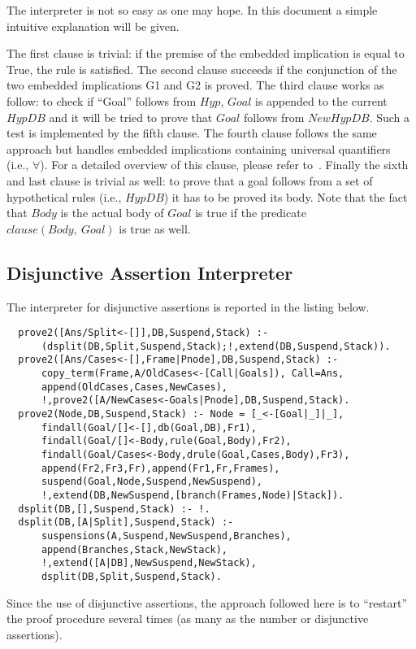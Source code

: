 The interpreter is not so easy as one may hope. In this document a simple
intuitive explanation will be given.

The first clause is trivial: if the premise of the embedded implication is equal to True,
the rule is satisfied. The second clause succeeds if the conjunction of the two embedded implications
G1 and G2 is proved. The third clause works as follow: to check if ``Goal''
follows from $Hyp$, $Goal$ is appended to the current $HypDB$ and it will be tried to
prove that $Goal$ follows from $NewHypDB$. Such a test is implemented by the
fifth clause. The fourth clause follows the
same approach but handles embedded implications containing universal quantifiers
(i.e., $\forall$). For a detailed overview of this clause, please refer to~\cite{McCartyS94}.
Finally the sixth and last clause is trivial as well: to prove that a goal follows
from a set of hypothetical rules (i.e., $HypDB$) it has to be proved its body. Note
that the fact that $Body$ is the actual body of $Goal$ is true if the
predicate $clause(Body,\ Goal)$ is true as well.


\subsection{Disjunctive Assertion Interpreter}
\label{sec:dai}
The interpreter for disjunctive assertions is reported in the listing below.

\begin{lstlisting}
  prove2([Ans/Split<-[]],DB,Suspend,Stack) :-
      (dsplit(DB,Split,Suspend,Stack);!,extend(DB,Suspend,Stack)).
  prove2([Ans/Cases<-[],Frame|Pnode],DB,Suspend,Stack) :-
      copy_term(Frame,A/OldCases<-[Call|Goals]), Call=Ans,
      append(OldCases,Cases,NewCases),
      !,prove2([A/NewCases<-Goals|Pnode],DB,Suspend,Stack).
  prove2(Node,DB,Suspend,Stack) :- Node = [_<-[Goal|_]|_],
      findall(Goal/[]<-[],db(Goal,DB),Fr1),
      findall(Goal/[]<-Body,rule(Goal,Body),Fr2),
      findall(Goal/Cases<-Body,drule(Goal,Cases,Body),Fr3),
      append(Fr2,Fr3,Fr),append(Fr1,Fr,Frames),
      suspend(Goal,Node,Suspend,NewSuspend),
      !,extend(DB,NewSuspend,[branch(Frames,Node)|Stack]).
  dsplit(DB,[],Suspend,Stack) :- !.
  dsplit(DB,[A|Split],Suspend,Stack) :-
      suspensions(A,Suspend,NewSuspend,Branches),
      append(Branches,Stack,NewStack),
      !,extend([A|DB],NewSuspend,NewStack),
      dsplit(DB,Split,Suspend,Stack).
\end{lstlisting}

Since the use of disjunctive assertions, the approach followed here is to ``restart'' the
proof procedure several times (as many as the number or disjunctive assertions).

